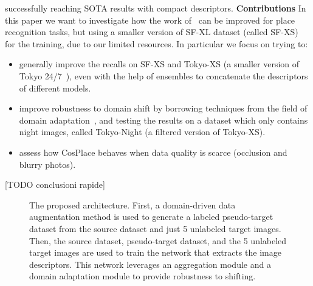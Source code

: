 \documentclass[10pt,twocolumn,letterpaper]{article}
\begin{document}
successfully reaching SOTA results with compact descriptors.
\newline
\textbf{Contributions}
In this paper we want to investigate how the work of~\cite{Berton_CVPR_2022_CosPlace} can be improved for place recognition tasks, but using a smaller version of SF-XL dataset (called SF-XS) for the training, due to our limited resources.
In particular we focus on trying to:
\begin{itemize}
    \item generally improve the recalls on SF-XS and Tokyo-XS (a smaller version of Tokyo 24/7~\cite{tokyo247}), even with the help of ensembles to concatenate the descriptors of different models.
    \item improve robustness to domain shift by borrowing techniques from the field of domain adaptation~\cite{adageo}, and testing the results on a dataset which only contains night images, called Tokyo-Night (a filtered version of Tokyo-XS).
    \item assess how CosPlace behaves when data quality is scarce (\eg occlusion and blurry photos). 
\end{itemize} 

[TODO conclusioni rapide]


\begin{figure*}
  \centering
  \begin{subfigure}{1.0\linewidth}
    \centering
    \caption{The proposed architecture. First, a domain-driven data augmentation method is used to generate a labeled pseudo-target dataset from the source dataset and just 5 unlabeled target images. Then, the source dataset, pseudo-target dataset, and the 5 unlabeled target images are used to train the network that extracts the image descriptors. This network leverages an aggregation module and a domain adaptation module to provide robustness to shifting.}
    \label{fig:our_architecture}
  \end{subfigure}
  \hfill
\end{figure*}

\end{document}
